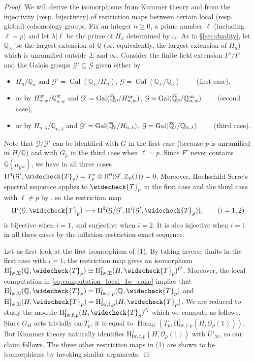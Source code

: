 \documentclass[12pt]{amsart}
\newcommand\bQ{\mathbb{Q}}
\newcommand\Zp{{\mathbb{Z}_p}}
\newcommand\cG{\mathcal{G}}
\newcommand\cO{\mathcal{O}}
\newcommand{\ob}[1]{\mkern 1.5mu\overline{\mkern-1.5mu#1\mkern-1.5mu}\mkern 1.5mu}
\DeclareMathOperator{\Gal}{Gal}
\DeclareMathOperator{\Hom}{Hom}
\newcommand{\HH}{\mathrm{H}}
\newcommand{\ff}{\mathrm{f}}
\newcommand{\Iw}{\mathrm{Iw}}
\newcommand{\ur}{\mathrm{ur}}
\theoremstyle{defstyle}
\theoremstyle{thmstyle}
\begin{document}
\begin{proof}
We will derive the isomorphisms from Kummer theory and from the injectivity (resp. bijectivity) of restriction maps between certain local (resp. global) cohomology groups. Fix an integer $n\geq 0$, a prime number $\ell$ (including $\ell=p$) and let $\lambda|\ell$ be the prime of $H_n$ determined by $\iota_\ell$.  As in \S\ref{sec:duality}, let $\bQ_\Sigma$ be the largest extension of $\bQ$ (or, equivalently, the largest extension of $H_n$) which is unramified outside $\Sigma$ and $\infty$. Consider the finite field extension $F'/F$ and the Galois groups $\cG' \subseteq \cG$ given either by 
\begin{itemize}
	\item  $H_n/\bQ_n$ and $\cG'=\Gal(\bQ_\Sigma/H_n)$, $\cG=\Gal(\bQ_\Sigma/\bQ_n)\qquad$ (first case), 
	\item or by $H_{n,w}^\ur/\bQ_{n,w}^\ur$ and $\cG'=\Gal(\ob{\bQ}_p/H_{n,w}^\ur)$, $\cG=\Gal(\ob{\bQ}_p/\bQ_{n,w}^\ur)\qquad$ (second case), 
	\item or by $H_{n,\lambda}/\bQ_{n,\lambda}$ and $\cG'=\Gal(\ob{\bQ}_\ell/H_{n,\lambda})$, $\cG=\Gal(\ob{\bQ}_\ell/\bQ_{n,\lambda})\qquad$ (third case).
\end{itemize} 
Note that $\cG/\cG'$ can be identified with $G$ in the first case (because $p$ is unramified in $H/\bQ$) and with $G_p$ in the third case when $\ell=p$. Since $F'$ never contains $\bQ(\mu_{p^\infty})$, we have in all three cases $\HH^0(\cG',\widecheck{T}_p)= T_p^* \otimes \HH^0(\cG',\Zp(1))=0$. Moreover, Hochschild-Serre's spectral sequence applies to $\widecheck{T}_p$ in the first case and the third case with $\ell\neq p$ by \cite[Appendix B, Proposition 2.7]{rubinES}, so the restriction map 
$$\HH^i(\cG,\widecheck{T}_p) \longrightarrow \HH^0(\cG/\cG',\HH^i(\cG',\widecheck{T}_p)), \qquad (i=1,2)$$
is bijective when $i=1$, and surjective when $i=2$. It is also injective when $i=1$ in all three cases by the inflation-restriction exact sequence.

Let us first look at the first isomorphism of (1). By taking inverse limits in the first case with $i=1$, the restriction map gives an isomorphism $\HH^1_{\Iw,\Sigma}(\bQ,\widecheck{T}_p) \simeq \HH^1_{\Iw,\Sigma}(H,\widecheck{T}_p)^G$. Moreover, the local computation in  \eqref{eq:computation_local_Iw_coho} implies that  $\HH^1_{\Iw,\Sigma}(\bQ,\widecheck{T}_p)=\HH^1_{\Iw,\ff,p}(\bQ,\widecheck{T}_p)$ and $\HH^1_{\Iw,\Sigma}(H,\widecheck{T}_p)=\HH^1_{\Iw,\ff,p}(H,\widecheck{T}_p)$. We are reduced to study the module $\HH^1_{\Iw,\ff,p}(H,\widecheck{T}_p)^G$ which we compute as follows. Since $G_H$ acts trivially on $T_p$, it is equal to $\Hom_G(T_p, \HH^1_{\Iw,\ff,p}(H,\cO_p(1)))$. But Kummer theory naturally identifies $\HH^1_{\Iw,\ff,p}(H,\cO_p(1))$ with $U'_\infty$, so our claim follows. The three other restriction maps in (1) are shown to be isomorphisms by invoking similar arguments.


\end{proof}
\end{document}
